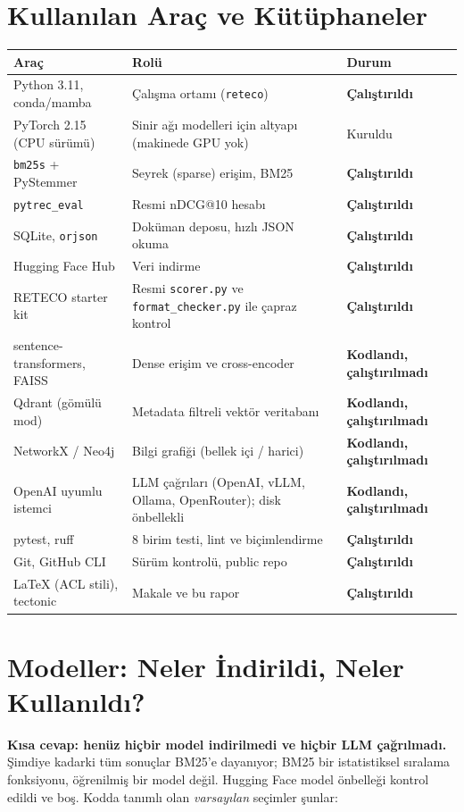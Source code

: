 \documentclass[11pt,a4paper]{article}
\newcommand{\OK}{\textcolor{ok}{\textbf{Çalıştırıldı}}}
\newcommand{\KOD}{\textcolor{wait}{\textbf{Kodlandı, çalıştırılmadı}}}
\begin{document}
\section{Kullanılan Araç ve Kütüphaneler}

\noindent\begin{tabularx}{\textwidth}{>{\raggedright\arraybackslash}p{3.8cm} L >{\raggedright\arraybackslash}p{2.9cm}}
\toprule
\textbf{Araç} & \textbf{Rolü} & \textbf{Durum} \\
\midrule
Python 3.11, conda/mamba & Çalışma ortamı (\texttt{reteco}) & \OK \\
PyTorch 2.15 (CPU sürümü) & Sinir ağı modelleri için altyapı (makinede GPU yok) & Kuruldu \\
\texttt{bm25s} + PyStemmer & Seyrek (sparse) erişim, BM25 & \OK \\
\texttt{pytrec\_eval} & Resmi nDCG@10 hesabı & \OK \\
SQLite, \texttt{orjson} & Doküman deposu, hızlı JSON okuma & \OK \\
Hugging Face Hub & Veri indirme & \OK \\
RETECO starter kit & Resmi \texttt{scorer.py} ve \texttt{format\_checker.py} ile çapraz kontrol & \OK \\
sentence-transformers, FAISS & Dense erişim ve cross-encoder & \KOD \\
Qdrant (gömülü mod) & Metadata filtreli vektör veritabanı & \KOD \\
NetworkX / Neo4j & Bilgi grafiği (bellek içi / harici) & \KOD \\
OpenAI uyumlu istemci & LLM çağrıları (OpenAI, vLLM, Ollama, OpenRouter); disk önbellekli & \KOD \\
pytest, ruff & 8 birim testi, lint ve biçimlendirme & \OK \\
Git, GitHub CLI & Sürüm kontrolü, public repo & \OK \\
LaTeX (ACL stili), tectonic & Makale ve bu rapor & \OK \\
\bottomrule
\end{tabularx}

\section{Modeller: Neler İndirildi, Neler Kullanıldı?}
\label{sec:modeller}

\textbf{Kısa cevap: henüz hiçbir model indirilmedi ve hiçbir LLM çağrılmadı.} Şimdiye kadarki
tüm sonuçlar BM25'e dayanıyor; BM25 bir istatistiksel sıralama fonksiyonu, öğrenilmiş bir model
değil. Hugging Face model önbelleği kontrol edildi ve boş. Kodda tanımlı olan
\emph{varsayılan} seçimler şunlar:
\end{document}
